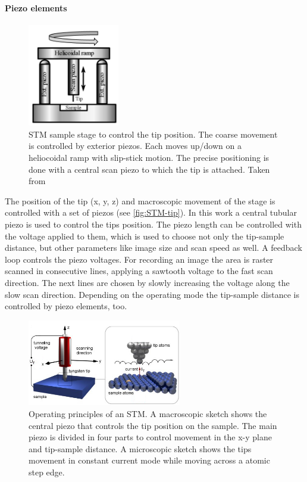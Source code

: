 \paragraph{Piezo elements}
\begin{figure} \centering
	\includegraphics[width=4cm]{./images/STM-sketch-2}
	\caption{STM sample stage to control the tip position. The coarse movement is controlled by exterior piezos. Each moves up/down on a heliocoidal ramp with slip-stick motion. The precise positioning is done with a central scan piezo to which the tip is attached. Taken from}
	\label{fig:stm-heliocoidal ramp}
\end{figure}
The position of the tip (x, y, z) and macroscopic movement of the stage is controlled with a set of piezos (see \textcolor{red}{\autoref{fig:STM-tip}}). In this work a central tubular piezo is used to control the tips position. The piezo length can be controlled with the voltage applied to them, which is used to choose not only the tip-sample distance, but other parameters like image size and scan speed as well. A feedback loop controls the piezo voltages. For recording an image the area is raster scanned in consecutive lines, applying a sawtooth voltage to the fast scan direction. The next lines are chosen by slowly increasing the voltage along the slow scan direction. Depending on the operating mode the tip-sample distance is controlled by piezo elements, too.

\begin{figure}\centering
	
\includegraphics[width=0.6\textwidth]{./images/stm-rutgers-modified.jpg}
	\caption{Operating principles of an STM. A macroscopic sketch  shows the central piezo that controls the tip position on the sample. The main piezo is divided in four parts to control movement in the x-y plane and tip-sample distance\cite{STM-rutgers}. A microscopic sketch shows the tips movement in constant current mode while moving across a atomic step edge.}
\label{fig:STM-tip}
\end{figure}

